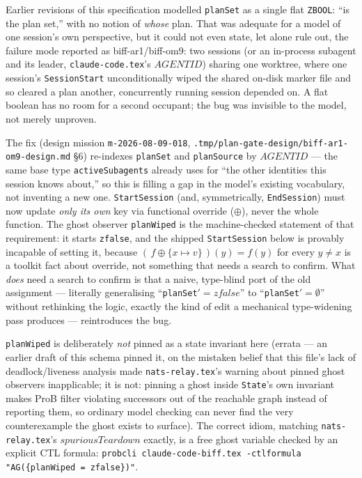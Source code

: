 \documentclass[a4paper,10pt,fleqn]{article}
\begin{document}
Earlier revisions of this specification modelled \texttt{planSet} as a
single flat \texttt{ZBOOL}: ``is the plan set,'' with no notion of
\emph{whose} plan.  That was adequate for a model of one session's own
perspective, but it could not even state, let alone rule out, the failure
mode reported as biff-ar1/biff-om9: two sessions (or an in-process
subagent and its leader, \texttt{claude-code.tex}'s $AGENTID$) sharing one
worktree, where one session's \texttt{SessionStart} unconditionally wiped
the shared on-disk marker file and so cleared a plan another, concurrently
running session depended on.  A flat boolean has no room for a second
occupant; the bug was invisible to the model, not merely unproven.

The fix (design mission \texttt{m-2026-08-09-018},
\texttt{.tmp/plan-gate-design/biff-ar1-om9-design.md} \S6) re-indexes
\texttt{planSet} and \texttt{planSource} by $AGENTID$ --- the same base
type \texttt{activeSubagents} already uses for ``the other identities this
session knows about,'' so this is filling a gap in the model's existing
vocabulary, not inventing a new one.  \texttt{StartSession} (and,
symmetrically, \texttt{EndSession}) must now update \emph{only its own}
key via functional override ($\oplus$), never the whole function.  The
ghost observer \texttt{planWiped} is the machine-checked statement of that
requirement: it starts \texttt{zfalse}, and the shipped
\texttt{StartSession} below is provably incapable of setting it, because
$(\, f \oplus \{x \mapsto v\}\,)(y) = f(y)$ for every $y \neq x$ is a
toolkit fact about override, not something that needs a search to confirm.
What \emph{does} need a search to confirm is that a naive, type-blind port
of the old assignment --- literally generalising
``\texttt{planSet}${}'{} = zfalse$'' to ``\texttt{planSet}${}'{} =
\emptyset$'' without rethinking the logic, exactly the kind of edit a
mechanical type-widening pass produces --- reintroduces the bug.

\texttt{planWiped} is deliberately \emph{not} pinned as a state invariant
here (errata --- an earlier draft of this schema pinned it, on the
mistaken belief that this file's lack of deadlock/liveness analysis made
\texttt{nats-relay.tex}'s warning about pinned ghost observers
inapplicable; it is not: pinning a ghost inside \texttt{State}'s own
invariant makes ProB filter violating successors out of the reachable
graph instead of reporting them, so ordinary model checking can never
find the very counterexample the ghost exists to surface).  The correct
idiom, matching \texttt{nats-relay.tex}'s $spuriousTeardown$ exactly, is
a free ghost variable checked by an explicit CTL formula:
\texttt{probcli claude-code-biff.tex -ctlformula "AG(\{planWiped =
zfalse\})"}.
\end{document}
